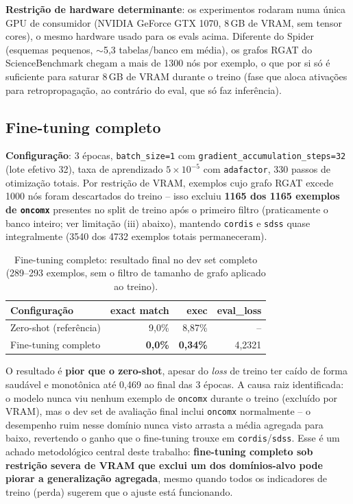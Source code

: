 \textbf{Restrição de hardware determinante}: os experimentos rodaram numa
única GPU de consumidor (NVIDIA GeForce GTX 1070, 8\,GB de VRAM, sem tensor
cores), o mesmo hardware usado para os evals acima. Diferente do Spider
(esquemas pequenos, $\sim$5,3 tabelas/banco em média), os grafos RGAT do
ScienceBenchmark chegam a mais de 1300 nós por exemplo, o que por si só é
suficiente para saturar 8\,GB de VRAM durante o treino (fase que aloca
ativações para retropropagação, ao contrário do eval, que só faz
inferência).

\subsection{Fine-tuning completo}
\label{sec:finetuning-full}

\textbf{Configuração}: 3 épocas, \texttt{batch\_size=1} com
\texttt{gradient\_accumulation\_steps=32} (lote efetivo 32), taxa de
aprendizado $5\times10^{-5}$ com \texttt{adafactor}, 330 passos de
otimização totais. Por restrição de VRAM, exemplos cujo grafo RGAT excede
1000 nós foram descartados do treino -- isso excluiu \textbf{1165 dos 1165
exemplos de \texttt{oncomx}} presentes no split de treino após o primeiro
filtro (praticamente o banco inteiro; ver limitação (iii) abaixo), mantendo
\texttt{cordis} e \texttt{sdss} quase integralmente (3540 dos 4732 exemplos
totais permaneceram).

\begin{table}[h]
\centering
\caption{Fine-tuning completo: resultado final no dev set completo (289--293 exemplos, sem o filtro de tamanho de grafo aplicado ao treino).}
\label{tab:finetuning-full}
\begin{tabular}{lrrr}
\toprule
\textbf{Configuração} & \textbf{exact match} & \textbf{exec} & \textbf{eval\_loss} \\
\midrule
Zero-shot (referência) & 9,0\%  & 8,87\% & -- \\
Fine-tuning completo    & \textbf{0,0\%} & \textbf{0,34\%} & 4,2321 \\
\bottomrule
\end{tabular}
\end{table}

O resultado é \textbf{pior que o zero-shot}, apesar do \emph{loss} de
treino ter caído de forma saudável e monotônica até 0,469 ao final das 3
épocas. A causa raiz identificada: o modelo nunca viu nenhum exemplo de
\texttt{oncomx} durante o treino (excluído por VRAM), mas o dev set de
avaliação final inclui \texttt{oncomx} normalmente -- o desempenho ruim
nesse domínio nunca visto arrasta a média agregada para baixo, revertendo
o ganho que o fine-tuning trouxe em \texttt{cordis}/\texttt{sdss}. Esse é
um achado metodológico central deste trabalho: \textbf{fine-tuning
completo sob restrição severa de VRAM que exclui um dos domínios-alvo pode
piorar a generalização agregada}, mesmo quando todos os indicadores de
treino (perda) sugerem que o ajuste está funcionando.

